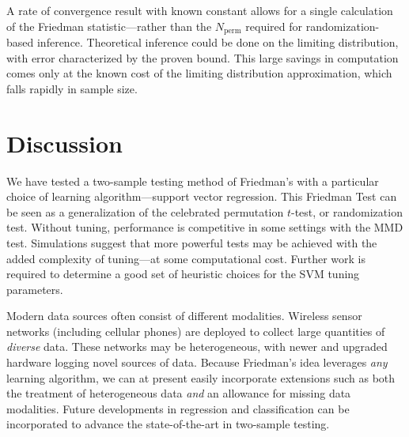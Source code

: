 A rate of convergence result with known constant allows
for a single calculation of the Friedman statistic---rather than the
$N_{\mathrm{perm}}$ required for randomization-based inference.
Theoretical inference could be done on the limiting distribution, with
error characterized by the proven bound.  This large savings in
computation comes only at the known cost of the limiting distribution
approximation, which falls rapidly in sample size.

\section{Discussion}
We have tested a two-sample testing method of Friedman's
\cite{friedman30908multivariate} with a particular choice of learning
algorithm---support vector regression.  This Friedman Test can be seen
as a generalization of the celebrated permutation $t$-test, or
randomization test.  Without tuning, performance is competitive in
some settings with the MMD test.  Simulations suggest that more
powerful tests may be achieved with the added complexity of
tuning---at some computational cost.  Further work is required to
determine a good set of heuristic choices for the SVM tuning parameters.

Modern data sources often consist of different modalities.  Wireless
sensor networks (including cellular phones) are deployed to collect
large quantities of \emph{diverse} data.  These networks may be
heterogeneous, with newer and upgraded hardware logging novel sources
of data.  Because Friedman's idea leverages \emph{any} learning algorithm, we
can at present easily incorporate extensions such as both the treatment of
heterogeneous data \emph{and} an allowance for missing data
modalities.  Future developments in regression and classification can
be incorporated to advance the state-of-the-art in two-sample testing.

